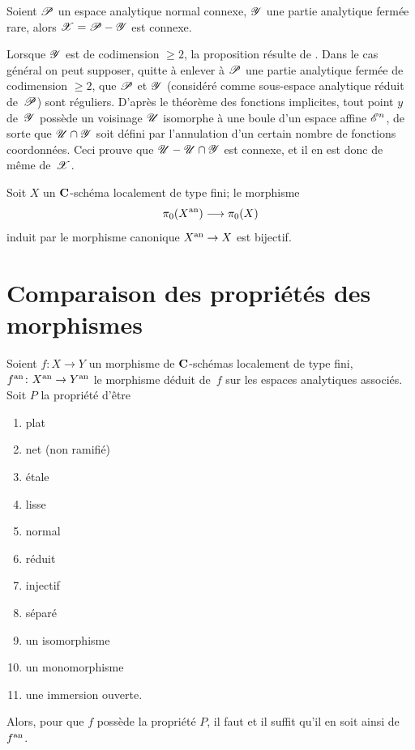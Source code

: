 \begin{lemme}
\label{XII.2.5}
Soient
$\cal{P} $ un espace analytique normal connexe, $\cal{Y}$ une
partie analytique ferm\'ee rare, alors $\cal{X} = \cal{P} - \cal{Y}$
est connexe.
\end{lemme}

Lorsque $\cal{Y}$ est de codimension $\geq 2$, la proposition
r\'esulte de \cite[ prop.\, 4]{XII.11}. Dans le cas g\'en\'eral on peut
supposer, quitte \`a enlever \`a $\cal{P}$ une partie analytique
ferm\'ee de codimension $\geq 2$, que $\cal{P}$ et $\cal{Y}$
(consid\'er\'e comme sous-espace analytique r\'eduit de~$\cal{P}$) sont r\'eguliers. D'apr\`es le th\'eor\`eme des
fonctions implicites, tout point $y$ de~$\cal{Y}$ poss\`ede un
voisinage $\cal{U}$ isomorphe \`a une boule d'un espace affine
$\cal{E}^{n}$, de sorte que $\cal{U} \cap \cal{Y}$ soit d\'efini par
l'annulation d'un certain nombre de fonctions coordonn\'ees. Ceci
prouve que $\cal{U} - \cal{U} \cap \cal{Y}$ est connexe, et il en est
donc de m\^eme de~$\cal{X}$.

\begin{corollaire}
\label{XII.2.6} Soit $X$ un $\mathbf{C}$-sch\'ema localement de type
fini; le morphisme
$$
\pi_0 (X^{\an}) \to \pi_0 (X)
$$
induit par le morphisme canonique $X^\an \to X$ est bijectif.
\end{corollaire}

\section{Comparaison des propri\'et\'es des morphismes}
\label{XII.3}

\begin{proposition}
\label{XII.3.1} Soient $f \colon X \to Y$ un morphisme de
$\mathbf{C}$-sch\'emas localement de type fini, $f^\an \colon X^\an \to
Y^\an$ le morphisme d\'eduit de~$f$ sur les espaces analytiques
associ\'es. Soit $P$ la propri\'et\'e d'\^etre
\begin{enumerate}
\item[(i)] plat
\item[(ii)] net (\ie non ramifi\'e)
\item[(iii)] \'etale
\item[(iv)] lisse
\item[(v)] normal
\item[(vi)]
r\'eduit
\item[(vii)] injectif
\item[(viii)] s\'epar\'e
\item[(ix)] un isomorphisme
\item[(x)] un monomorphisme
\item[(xi)] une immersion ouverte.
\end{enumerate}
Alors, pour que $f$ poss\`ede la propri\'et\'e $P$, il faut et
il suffit qu'il en soit ainsi de~$f^{\mathrm{an}}$.
\end{proposition}

